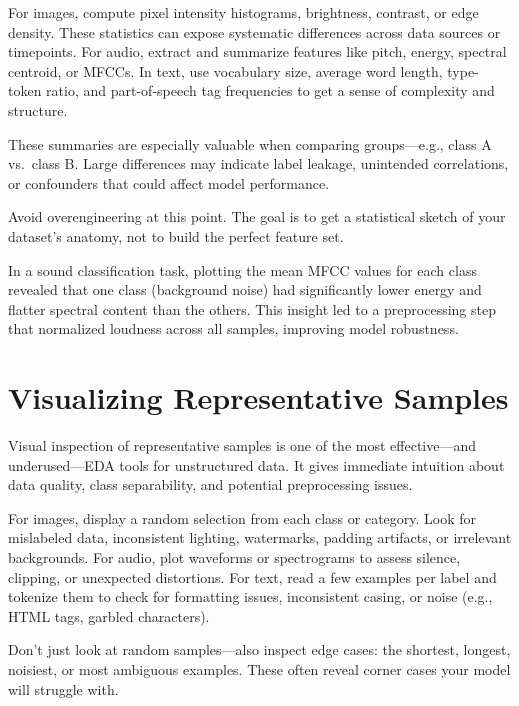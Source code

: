 \documentclass[12pt,openany]{book}
\begin{document}
For images, compute pixel intensity histograms, brightness, contrast, or edge density. These statistics can expose systematic differences across data sources or timepoints. For audio, extract and summarize features like pitch, energy, spectral centroid, or MFCCs. In text, use vocabulary size, average word length, type-token ratio, and part-of-speech tag frequencies to get a sense of complexity and structure.
\newline

These summaries are especially valuable when comparing groups—e.g., class A vs.\ class B. Large differences may indicate label leakage, unintended correlations, or confounders that could affect model performance.
\newline

Avoid overengineering at this point. The goal is to get a statistical sketch of your dataset’s anatomy, not to build the perfect feature set.

\begin{examplebox}
In a sound classification task, plotting the mean MFCC values for each class revealed that one class (background noise) had significantly lower energy and flatter spectral content than the others. This insight led to a preprocessing step that normalized loudness across all samples, improving model robustness.
\end{examplebox}



\section{Visualizing Representative Samples}

Visual inspection of representative samples is one of the most effective—and underused—EDA tools for unstructured data. It gives immediate intuition about data quality, class separability, and potential preprocessing issues.
\newline

For images, display a random selection from each class or category. Look for mislabeled data, inconsistent lighting, watermarks, padding artifacts, or irrelevant backgrounds. For audio, plot waveforms or spectrograms to assess silence, clipping, or unexpected distortions. For text, read a few examples per label and tokenize them to check for formatting issues, inconsistent casing, or noise (e.g., HTML tags, garbled characters).
\newline

Don’t just look at random samples—also inspect edge cases: the shortest, longest, noisiest, or most ambiguous examples. These often reveal corner cases your model will struggle with.
\newline
\end{document}
